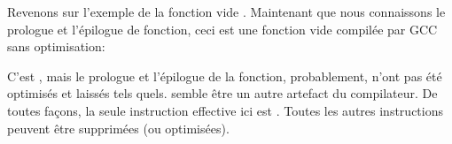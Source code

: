 
Revenons sur l'exemple de la fonction vide .
Maintenant que nous connaissons le prologue et l'épilogue de fonction, ceci est
une fonction vide  compilée par GCC sans optimisation:



C'est , mais le prologue et l'épilogue de la fonction, probablement, n'ont
pas été optimisés et laissés tels quels.
 semble être un autre artefact du compilateur.
De toutes façons, la seule instruction effective ici est .
Toutes les autres instructions peuvent être supprimées (ou optimisées).

